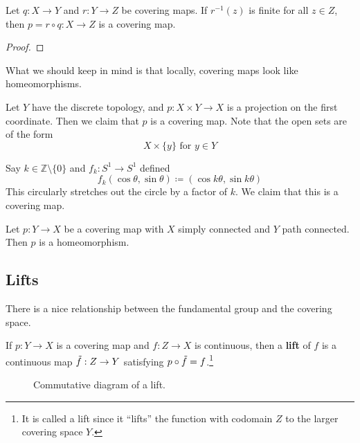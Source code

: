   \begin{theorem}
    Let $q: X \to Y$ and $r: Y \to Z$ be covering maps. If $r^{-1}(z)$ is finite for all $z \in Z$, then $p = r \circ q: X \to Z$ is a covering map. 
  \end{theorem}
  \begin{proof}
    
  \end{proof}

  What we should keep in mind is that locally, covering maps look like homeomorphisms. 

  \begin{example}
    Let $Y$ have the discrete topology, and $p: X \times Y \to X$ is a projection on the first coordinate. Then we claim that $p$ is a covering map. Note that the open sets are of the form 
    \begin{equation}
      X \times \{y\} \text{ for } y \in Y
    \end{equation}
  \end{example}

  \begin{example}
    Say $k \in \mathbb{Z} \setminus \{0\}$ and $f_k : S^1 \to S^1$ defined 
    \begin{equation}
      f_k (\cos{\theta}, \sin{\theta}) \coloneqq (\cos{k \theta}, \sin{k\theta})
    \end{equation}
    This circularly stretches out the circle by a factor of $k$. We claim that this is a covering map. 
  \end{example}

  \begin{theorem}
    Let $p: Y \to X$ be a covering map with $X$ simply connected and $Y$ path connected. Then $p$ is a homeomorphism. 
  \end{theorem}

\subsection{Lifts}
  
  There is a nice relationship between the fundamental group and the covering space. 

  \begin{definition}[Lift]
    If $p: Y \to X$ is a covering map and $f: Z \to X$ is continuous, then a \textbf{lift} of $f$ is a continuous map $\Tilde{f}: Z \to Y$ satisfying $p \circ \Tilde{f} = f$.\footnote{It is called a lift since it ``lifts'' the function with codomain $Z$ to the larger covering space $Y$.}

    \begin{figure}[H]
      \centering 
      \caption{Commutative diagram of a lift.} 
      \label{fig:lift}
    \end{figure}
  \end{definition}

